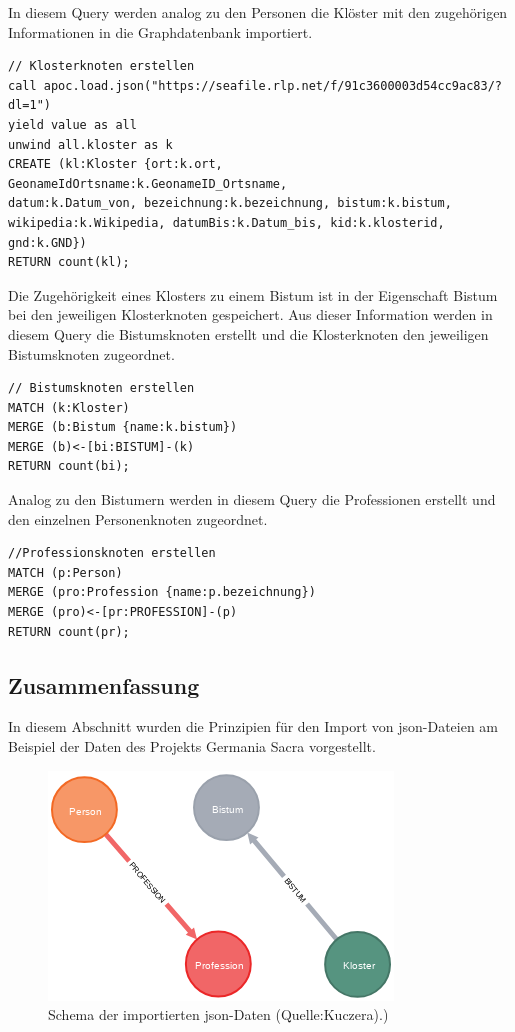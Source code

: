 In diesem Query werden analog zu den Personen die Klöster mit den
zugehörigen Informationen in die Graphdatenbank importiert.

\begin{verbatim}
// Klosterknoten erstellen
call apoc.load.json("https://seafile.rlp.net/f/91c3600003d54cc9ac83/?dl=1")
yield value as all
unwind all.kloster as k
CREATE (kl:Kloster {ort:k.ort,
GeonameIdOrtsname:k.GeonameID_Ortsname,
datum:k.Datum_von, bezeichnung:k.bezeichnung, bistum:k.bistum,
wikipedia:k.Wikipedia, datumBis:k.Datum_bis, kid:k.klosterid, gnd:k.GND})
RETURN count(kl);
\end{verbatim}

Die Zugehörigkeit eines Klosters zu einem Bistum ist in der Eigenschaft
Bistum bei den jeweiligen Klosterknoten gespeichert. Aus dieser
Information werden in diesem Query die Bistumsknoten erstellt und die
Klosterknoten den jeweiligen Bistumsknoten zugeordnet.

\begin{verbatim}
// Bistumsknoten erstellen
MATCH (k:Kloster)
MERGE (b:Bistum {name:k.bistum})
MERGE (b)<-[bi:BISTUM]-(k)
RETURN count(bi);
\end{verbatim}

Analog zu den Bistumern werden in diesem Query die Professionen erstellt
und den einzelnen Personenknoten zugeordnet.

\begin{verbatim}
//Professionsknoten erstellen
MATCH (p:Person)
MERGE (pro:Profession {name:p.bezeichnung})
MERGE (pro)<-[pr:PROFESSION]-(p)
RETURN count(pr);
\end{verbatim}

\hypertarget{zusammenfassung-7}{%
\subsection{Zusammenfassung}\label{zusammenfassung-7}}

In diesem Abschnitt wurden die Prinzipien für den Import von
json-Dateien am Beispiel der Daten des Projekts Germania Sacra
vorgestellt.

\begin{figure}
\centering
\includegraphics{Bilder/GS-Schema1.png}
\caption{Schema der importierten json-Daten (Quelle:Kuczera).)}
\end{figure}

